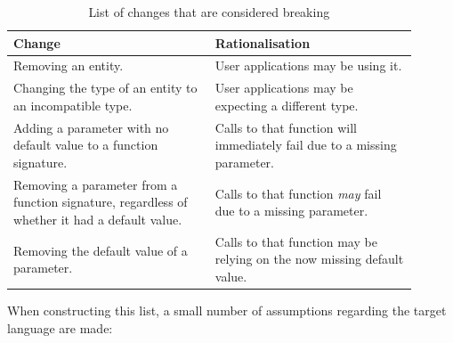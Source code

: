 \documentclass{l4proj}
\begin{document}
\begin{table}[H]
\centering
\begin{tabular}{|p{0.45\linewidth}|p{0.45\linewidth}|}
\hline
\textbf{Change}                                                                               & \textbf{Rationalisation}                                                 \\
\hline
Removing an entity.                                                                           & User applications may be using it.                                       \\
\hline
Changing the type of an entity to an incompatible type.                                       & User applications may be expecting a different type.                     \\
\hline
Adding a parameter with no default value to a function signature.                             & Calls to that function will immediately fail due to a missing parameter. \\
\hline
Removing a parameter from a function signature, regardless of whether it had a default value. & Calls to that function \textit{may} fail due to a missing parameter.     \\
\hline
Removing the default value of a parameter.                                                    & Calls to that function may be relying on the now missing default value.  \\
\hline
\end{tabular}
\caption{List of changes that are considered breaking}
\end{table}

When constructing this list, a small number of assumptions
regarding the target language are made:
\end{document}
